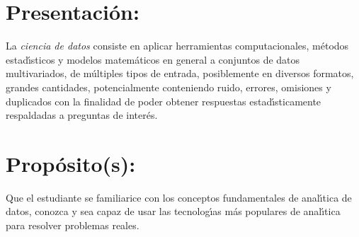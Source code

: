 \section{Presentaci\'{o}n:}

La {\em ciencia de datos} consiste en aplicar herramientas
computacionales, m\'{e}todos estad\'{\i}sticos y modelos
matem\'{a}ticos en general a conjuntos de datos multivariados, de
m\'{u}ltiples tipos de entrada, posiblemente en diversos formatos,
grandes cantidades, potencialmente conteniendo ruido, errores,
omisiones y duplicados con la finalidad de poder obtener respuestas
estad\'{\i}sticamente respaldadas a preguntas de inter\'{e}s.

\section{Prop\'{o}sito(s):}

Que el estudiante se familiarice con los conceptos fundamentales de
anal\'{\i}tica de datos, conozca y sea capaz de usar las
tecnolog\'{\i}as m\'{a}s populares de anal\'{\i}tica para resolver
problemas reales.
